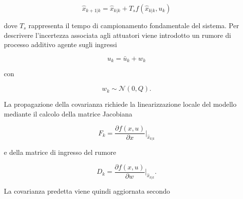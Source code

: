 \documentclass[12pt,a4paper]{article}
\begin{document}
\begin{equation}
\hat{x}_{k+1|k} = \hat{x}_{k|k} + T_s f(\hat{x}_{k|k},u_k)
\end{equation}

dove $T_s$ rappresenta il tempo di campionamento fondamentale del sistema.
Per descrivere l'incertezza associata agli attuatori viene introdotto un rumore di processo additivo agente sugli ingressi

\begin{equation}
u_k = \bar{u}_k + w_k
\end{equation}

con

\begin{equation}
w_k \sim \mathcal{N}(0,Q).
\end{equation}

La propagazione della covarianza richiede la linearizzazione locale del modello mediante il calcolo della matrice Jacobiana

\begin{equation}
F_k = \frac{\partial f(x,u)}{\partial x} \Bigg|_{\hat{x}_{k|k}}
\end{equation}

e della matrice di ingresso del rumore

\begin{equation}
D_k = \frac{\partial f(x,u)}{\partial w} \Bigg|_{\hat{x}_{k|k}}.
\end{equation}

La covarianza predetta viene quindi aggiornata secondo
\end{document}
